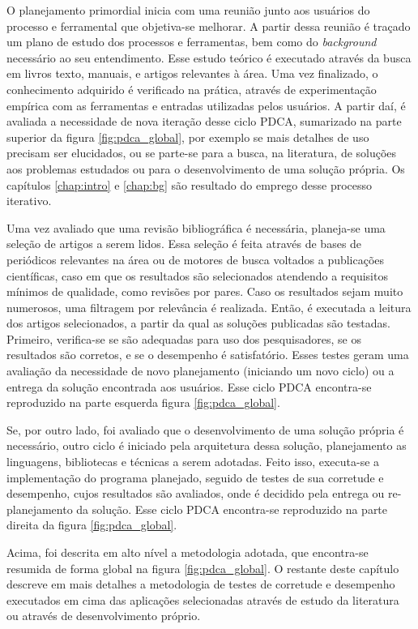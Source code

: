 \documentclass[cic,tc]{iiufrgs}
\begin{document}
O planejamento primordial inicia com uma reunião junto aos usuários do processo
e ferramental que objetiva-se melhorar. A partir dessa reunião é traçado um
plano de estudo dos processos e ferramentas, bem como do \textit{background}
necessário ao seu entendimento. Esse estudo teórico é executado através da
busca em livros texto, manuais, e artigos relevantes à área. Uma vez
finalizado, o conhecimento adquirido é verificado na prática, através de
experimentação empírica com as ferramentas e entradas utilizadas pelos
usuários. A partir daí, é avaliada a necessidade de nova iteração desse ciclo
PDCA, sumarizado na parte superior da figura \ref{fig:pdca_global}, por exemplo
se mais detalhes de uso precisam ser elucidados, ou se parte-se para a busca,
na literatura, de soluções aos problemas estudados ou para o desenvolvimento de
uma solução própria. Os capítulos \ref{chap:intro} e \ref{chap:bg} são
resultado do emprego desse processo iterativo.  

Uma vez avaliado que uma revisão bibliográfica é necessária, planeja-se uma
seleção de artigos a serem lidos. Essa seleção é feita através de bases de
periódicos relevantes na área ou de motores de busca voltados a publicações
científicas, caso em que os resultados são selecionados atendendo a requisitos
mínimos de qualidade, como revisões por pares. Caso os resultados sejam muito
numerosos, uma filtragem por relevância é realizada. Então, é executada a
leitura dos artigos selecionados, a partir da qual as soluções publicadas são
testadas. Primeiro, verifica-se se são adequadas para uso dos pesquisadores, se
os resultados são corretos, e se o desempenho é satisfatório. Esses testes
geram uma avaliação da necessidade de novo planejamento (iniciando um novo
ciclo) ou a entrega da solução encontrada aos usuários. Esse ciclo PDCA
encontra-se reproduzido na parte esquerda figura \ref{fig:pdca_global}.

Se, por outro lado, foi avaliado que o desenvolvimento de uma solução própria é
necessário, outro ciclo é iniciado pela arquitetura dessa solução, planejamento
as linguagens, bibliotecas e técnicas a serem adotadas. Feito isso, executa-se
a implementação do programa planejado, seguido de testes de sua corretude e
desempenho, cujos resultados são avaliados, onde é decidido pela entrega ou
re-planejamento da solução. Esse ciclo PDCA encontra-se reproduzido na parte
direita da figura \ref{fig:pdca_global}.

Acima, foi descrita em alto nível a metodologia adotada, que encontra-se
resumida de forma global na figura \ref{fig:pdca_global}. O restante deste
capítulo descreve em mais detalhes a metodologia de testes de corretude e
desempenho executados em cima das aplicações selecionadas através de estudo da
literatura ou através de desenvolvimento próprio.
\end{document}
